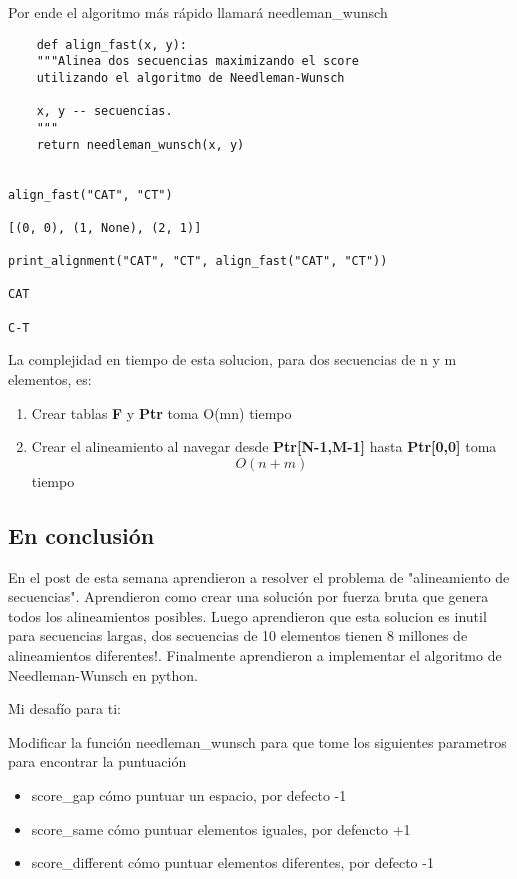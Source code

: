 \documentclass[usenatbib]{tjaa}
\begin{document}
Por ende el algoritmo más rápido llamará 
needleman\_wunsch

\begin{verbatim}
    def align_fast(x, y):
    """Alinea dos secuencias maximizando el score
    utilizando el algoritmo de Needleman-Wunsch

    x, y -- secuencias.
    """
    return needleman_wunsch(x, y)


align_fast("CAT", "CT")

[(0, 0), (1, None), (2, 1)]

print_alignment("CAT", "CT", align_fast("CAT", "CT"))

CAT

C-T
\end{verbatim}

La complejidad en tiempo de esta solucion, para dos secuencias de n y m elementos, es:

\begin{enumerate}
    \item Crear tablas \textbf{F} y \textbf{Ptr} toma O(mn) tiempo
    \item Crear el alineamiento al navegar desde \textbf{Ptr[N-1,M-1]} hasta \textbf{Ptr[0,0]} toma \[O(n + m)\] tiempo
\end{enumerate}

\subsection{En conclusión}

En el post de esta semana aprendieron a resolver el problema de "alineamiento de secuencias". Aprendieron como crear una solución por fuerza bruta que genera todos los alineamientos posibles. Luego aprendieron que esta solucion es inutil para secuencias largas, dos secuencias de 10 elementos tienen 8 millones de alineamientos diferentes!. Finalmente aprendieron a implementar el algoritmo de Needleman-Wunsch en python.

Mi desafío para ti:

Modificar la función needleman\_wunsch para que tome los siguientes parametros para encontrar la puntuación

\begin{itemize}
    \item score\_gap cómo puntuar un espacio, por defecto -1
    \item score\_same cómo puntuar elementos iguales, por defencto +1
    \item score\_different cómo puntuar elementos diferentes, por defecto -1
\end{itemize}
\end{document}
